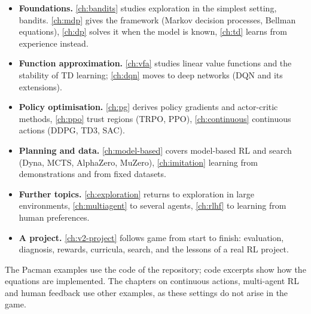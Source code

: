 \begin{itemize}[nosep]
  \item \textbf{Foundations.} \cref{ch:bandits} studies exploration in the
    simplest setting, bandits. \cref{ch:mdp} gives the framework (Markov
    decision processes, Bellman equations), \cref{ch:dp} solves it when the
    model is known, \cref{ch:td} learns from experience instead.
  \item \textbf{Function approximation.} \cref{ch:vfa} studies linear value
    functions and the stability of TD learning; \cref{ch:dqn} moves to deep
    networks (DQN and its extensions).
  \item \textbf{Policy optimisation.} \cref{ch:pg} derives policy gradients
    and actor-critic methods, \cref{ch:ppo} trust regions (TRPO, PPO),
    \cref{ch:continuous} continuous actions (DDPG, TD3, SAC).
  \item \textbf{Planning and data.} \cref{ch:model-based} covers model-based
    RL and search (Dyna, MCTS, AlphaZero, MuZero), \cref{ch:imitation}
    learning from demonstrations and from fixed datasets.
  \item \textbf{Further topics.} \cref{ch:exploration} returns to
    exploration in large environments, \cref{ch:multiagent} to several
    agents, \cref{ch:rlhf} to learning from human preferences.
  \item \textbf{A project.} \cref{ch:v2-project} follows game 
    from start to finish: evaluation, diagnosis, rewards, curricula,
    search, and the lessons of a real RL project.
\end{itemize}
The Pacman examples use the code of the repository; code excerpts show
how the equations are implemented. The chapters on continuous actions,
multi-agent RL and human feedback use other examples, as these settings do
not arise in the game.
